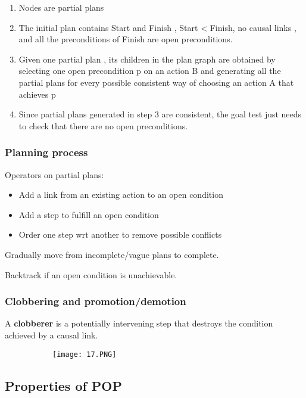 \documentclass{article}
\begin{document}
\begin{enumerate}
    \item Nodes are partial plans
    \item The initial plan contains Start and Finish , Start < Finish, no causal links , and all the preconditions of Finish are open preconditions.
    \item Given one partial plan , its children in the plan graph are obtained by selecting one open precondition p on an action B and generating all the partial plans for every possible consistent way of choosing an action A that achieves p
    \item Since partial plans generated in step 3 are consistent, the goal test just needs to check that there are no open preconditions.
\end{enumerate}

\subsubsection{Planning process}

Operators on partial plans:

\begin{itemize}
    \item Add a link from an existing action to an open condition
    \item Add a step to fulfill an open condition
    \item Order one step wrt another to remove possible conflicts
\end{itemize}

Gradually move from incomplete/vague plans to complete.

Backtrack if an open condition is unachievable.

\subsubsection{Clobbering and promotion/demotion}

A \textbf{clobberer} is a potentially intervening step that destroys the condition achieved by a causal link.

\begin{figure}[ht!]
  \centering
  \begin{subfigure}[b]{0.6\linewidth}
    \texttt{[image: 17.PNG]}
  \end{subfigure}
\end{figure}

\subsection{Properties of POP}
\end{document}
